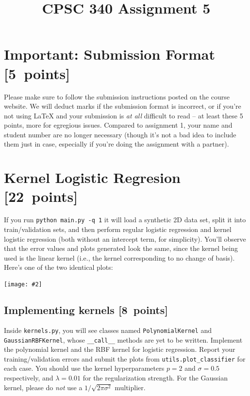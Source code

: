 \documentclass{article}
\newcommand{\blu}[1]{{\textcolor{blu}{#1}}}
\let\ask\blu
\newenvironment{asking}{\begingroup\color{blu}}{\endgroup}
\newcommand\pts[1]{\textcolor{pointscolour}{[#1~points]}}
\newcommand{\centerfig}[2]{\begin{center}\texttt{[image: \#2]}\end{center}}
\begin{document}
\title{CPSC 340 Assignment 5}
\date{}
\maketitle
\vspace{-6em}



\section*{Important: Submission Format \pts{5}}

Please make sure to follow the submission instructions posted on the course website.
\ask{We will deduct marks if the submission format is incorrect, or if you're not using \LaTeX{} and your submission is \emph{at all} difficult to read} -- at least these 5 points, more for egregious issues.
Compared to assignment 1, your name and student number are no longer necessary (though it's not a bad idea to include them just in case, especially if you're doing the assignment with a partner).

\vspace{1em}



\section{Kernel Logistic Regresion \pts{22}}

If you run \verb|python main.py -q 1| it will load a synthetic 2D data set, split it into train/validation sets, and then perform regular logistic regression and kernel logistic regression (both without an intercept term, for simplicity). You'll observe that the error values and plots generated look the same, since the kernel being used is the linear kernel (i.e., the kernel corresponding to no change of basis). Here's one of the two identical plots:
\centerfig{0.5}{figs/logReg.png}


\subsection{Implementing kernels \pts{8}}

Inside \texttt{kernels.py}, you will see classes named \texttt{PolynomialKernel} and \texttt{GaussianRBFKernel}, whose \verb|__call__| methods are yet to be written.
\begin{asking}
  Implement the polynomial kernel and the RBF kernel for logistic regression.
  Report your training/validation errors and submit the plots from \verb|utils.plot_classifier| for each case.
\end{asking}
You should use the kernel hyperparameters $p=2$ and $\sigma=0.5$ respectively,
and $\lambda=0.01$ for the regularization strength.
For the Gaussian kernel, please do \emph{not} use a $1/\sqrt{2\pi\sigma^2}$ multiplier.
\end{document}

